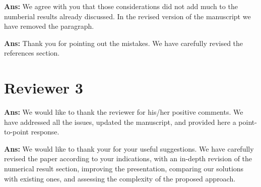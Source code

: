 \documentclass[draftcls,onecolumn,12pt]{IEEEtran}
\begin{document}
{\bf Ans:} We agree with you that those considerations did not add much to the numberial results already discussed. In the revised version of the manuscript we have removed the paragraph.

\vspace{5mm} %
\begin{framed}
\end{framed}

{\bf Ans:} Thank you for pointing out the mistakes. We have carefully revised the references section. 
\vspace{5mm} %


\clearpage


\section*{Reviewer 3}
\begin{framed}
\end{framed}

{\bf Ans:} We would like to thank the reviewer for his/her positive comments. We have addressed all the issues, updated the manuscript, and provided here a point-to-point response. 

\begin{framed}
\end{framed}

{\bf Ans:} We would like to thank your for your useful suggestions. We have carefully revised the paper according to your indications, with an in-depth revision of the numerical result section, improving the presentation, comparing our solutions with existing ones, and assessing the complexity of the proposed approach.
\end{document}
